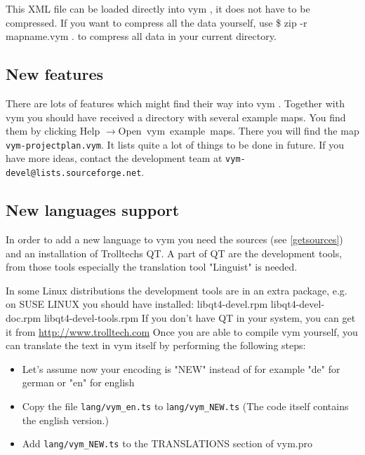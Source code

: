 \documentclass[12pt,a4paper]{article}
\newcommand{\vym}{{\sc vym }}
\newcommand{\ra}{$\longrightarrow$}
\newenvironment{code}[1] { \verbatim #1}{\endverbatim  }
\begin{document}
\begin{appendix}
This XML file can be loaded directly into \vym, it does not have to be
compressed. If you want to compress all the data yourself, use
\begin{code}
\$ zip -r mapname.vym .
\end{code}
to compress all data in your current directory.

\subsection{New features}
There are lots of features which might find their way into \vym.
Together with \vym you should have received a directory with several
example maps. You find them by clicking Help \ra Open~vym~example~maps.
There you will find the map {\tt vym-projectplan.vym}. It lists quite a
lot of things to be done in future. If you have more ideas, contact the
development team at {\tt vym-devel@lists.sourceforge.net}.


\subsection{New languages support}
In order to add a new language to \vym you need 
the sources (see \ref{getsources}) and
an installation of Trolltechs QT. A part of QT are the development
tools, from those tools especially the translation tool "Linguist" is
needed. 

In some Linux distributions the development tools are in an extra package, e.g. on SUSE LINUX you should have installed:
\begin{code}
libqt4-devel.rpm
libqt4-devel-doc.rpm
libqt4-devel-tools.rpm
\end{code}
If you don't have QT in your system, you can get it from 
    \href{http://www.trolltech.com}{http://www.trolltech.com} Once you
    are able to compile vym yourself, you can translate the text in vym
    itself by performing the following steps:
\begin{itemize}
    \item Let's assume now your encoding is "NEW" instead of for example
    "de" for german or "en" for english
    
    \item Copy the file {\tt lang/vym\_en.ts} to l{\tt ang/vym\_NEW.ts} (The code
    itself contains the english version.)
        
    \item Add {\tt lang/vym\_NEW.ts} to the TRANSLATIONS section of vym.pro


\end{itemize}
\end{appendix}
\end{document}
